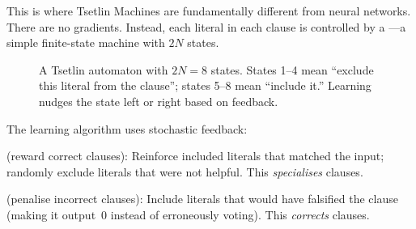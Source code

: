 This is where Tsetlin Machines are fundamentally different from neural
networks. There are no gradients. Instead, each literal in each clause
is controlled by a ---a simple finite-state
machine with $2N$ states.

\begin{figure}[htbp]
\centering
{}
\caption{A Tsetlin automaton with $2N = 8$ states. States 1--4 mean
  ``exclude this literal from the clause''; states 5--8 mean ``include
  it.'' Learning nudges the state left or right based on feedback.}
\label{fig:tsetlin-automaton}
\end{figure}

The learning algorithm uses stochastic feedback:

\begin{description}[leftmargin=1em]
  \item[Type~I feedback] (reward correct clauses): Reinforce included
    literals that matched the input; randomly exclude literals that
    were not helpful. This \emph{specialises} clauses.
  \item[Type~II feedback] (penalise incorrect clauses): Include
    literals that would have falsified the clause (making it output~0
    instead of erroneously voting). This \emph{corrects} clauses.
\end{description}

